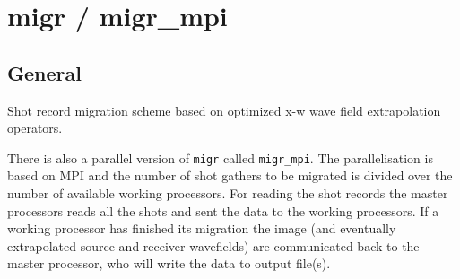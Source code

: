 \newpage
\section{\label{migr}migr / migr\_mpi}

\subsection{General}
Shot record migration scheme based on optimized x-w wave field extrapolation operators. 

There is also a parallel version of {\tt migr} called {\tt migr\_mpi}. The parallelisation is based on MPI and the number of shot gathers to be migrated is divided over the number of available working processors. For reading the shot records the master processors reads all the shots and sent the data to the working processors. If a working processor has finished its migration the image (and eventually extrapolated source and receiver wavefields) are communicated back to the master processor, who will write the data to output file(s). 


